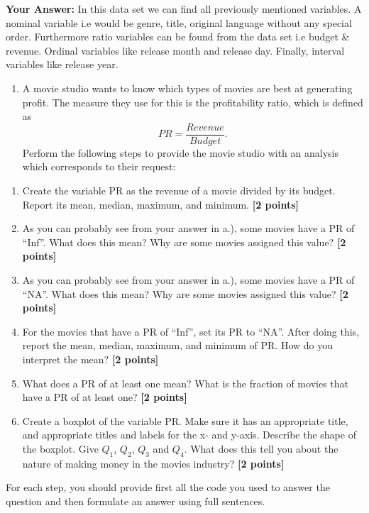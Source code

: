 \documentclass[
]{article}
\providecommand{\tightlist}{%
  \setlength{\itemsep}{0pt}\setlength{\parskip}{0pt}}
\begin{document}
\textbf{Your Answer:} In this data set we can find all previously
mentioned variables. A nominal variable i.e would be genre, title,
original language without any special order. Furthermore ratio variables
can be found from the data set i.e budget \& revenue. Ordinal variables
like release month and release day. Finally, interval variables like
release year.

\begin{enumerate}
\def\labelenumi{\arabic{enumi}.}
\setcounter{enumi}{2}
\tightlist
\item
  A movie studio wants to know which types of movies are best at
  generating profit. The measure they use for this is the profitability
  ratio, which is defined as \[PR=\frac{Revenue}{Budget}.\] Perform the
  following steps to provide the movie studio with an analysis which
  corresponds to their request:
\end{enumerate}

\begin{enumerate}
\def\labelenumi{\alph{enumi}.}
\tightlist
\item
  Create the variable PR as the revenue of a movie divided by its
  budget. Report its mean, median, maximum, and minimum.
  \textbf{[2 points]}
\item
  As you can probably see from your answer in a.), some movies have a PR
  of ``Inf''. What does this mean? Why are some movies assigned this
  value? \textbf{[2 points]}
\item
  As you can probably see from your answer in a.), some movies have a PR
  of ``NA''. What does this mean? Why are some movies assigned this
  value? \textbf{[2 points]}
\item
  For the movies that have a PR of ``Inf'', set its PR to ``NA''. After
  doing this, report the mean, median, maximum, and minimum of PR. How
  do you interpret the mean? \textbf{[2 points]}
\item
  What does a PR of at least one mean? What is the fraction of movies
  that have a PR of at least one? \textbf{[2 points]}
\item
  Create a boxplot of the variable PR. Make sure it has an appropriate
  title, and appropriate titles and labels for the x- and y-axis.
  Describe the shape of the boxplot. Give \(Q_1\), \(Q_2\), \(Q_3\) and
  \(Q_4\). What does this tell you about the nature of making money in
  the movies industry? \textbf{[2 points]}
\end{enumerate}

For each step, you should provide first all the code you used to answer
the question and then formulate an answer using full sentences.
\end{document}
